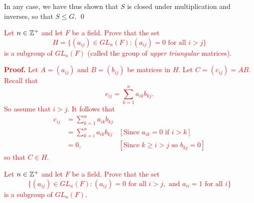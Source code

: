 \begin{enumerate}
      In any case, we have thus shown that $S$ is closed under multiplication
      and inverses, so that $S \le G$. \qed
   \textcolor{red}{\item[2.1.16]  Let $n \in \mathbb{Z}^+$ and let $F$ be a field. Prove 
               that the set
                  $$H = \{(a_{ij}) \in GL_n(F) : (a_{ij}) = 0 \text{ for all }
                     i > j\}$$
                  is a subgroup of $GL_n(F)$ (called the group of
                  \textit{upper triangular} matrices).}

      \textcolor{red}{\textbf{Proof.} Let $A = (a_{ij})$ and $B = (b_{ij})$ be matrices in $H$. 
      Let $C = (c_{ij}) = AB$. Recall that
      $$c_{ij} = \sum_{k=1}^na_{ik}b_{kj}.$$
      So assume that $i > j$. It follows that
      \begin{align*}
         c_{ij} &= \sum_{k=1}^na_{ik}b_{kj} \\
            &= \sum_{k=i}^na_{ik}b_{kj}
               &[\text{Since }a_{ik} = 0 \text{ if } i > k] \\
            &= 0, &[\text{Since }k \ge i > j \text{ so } b_{kj} = 0]
      \end{align*}
      so that $C \in H$.}
   \textcolor{red}{\item[2.1.17]  Let $n \in \mathbb{Z}^+$ and let $F$ be a field. Prove that the set
                  $$\{(a_{ij}) \in GL_n(F) : (a_{ij}) = 0 \text{ for all }
                      i > j, \text{ and } a_{ii} = 1 \text{ for all }i\}$$
                  is a subgroup of $GL_n(F)$.}
\end{enumerate}
